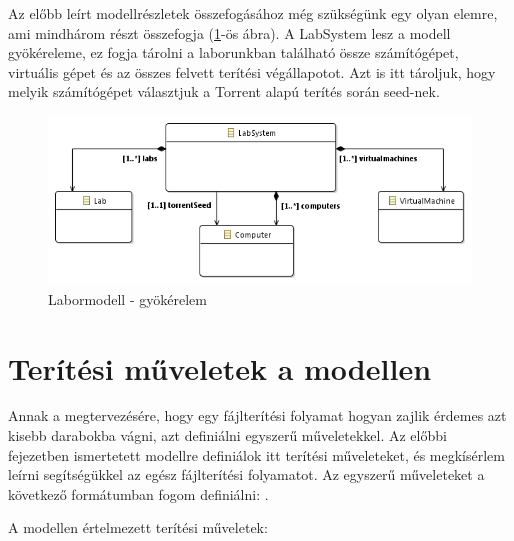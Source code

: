Az előbb leírt modellrészletek összefogásához még szükségünk egy olyan elemre, ami mindhárom részt összefogja (\ref{fig:designmodelroot}-ös ábra). A LabSystem lesz a modell gyökéreleme, ez fogja tárolni a laborunkban található össze számítógépet, virtuális gépet és az összes felvett terítési végállapotot. Azt is itt tároljuk, hogy melyik számítógépet választjuk a Torrent alapú terítés során seed-nek.

\begin{figure}[h!]
	\centering
	\includegraphics[width=130mm, keepaspectratio]{figures/design_modelroot.png}
	\caption{Labormodell - gyökérelem}
	\label{fig:designmodelroot}
\end{figure}

\section{Terítési műveletek a modellen}
\label{distrops}

Annak a megtervezésére, hogy egy fájlterítési folyamat hogyan zajlik érdemes azt kisebb darabokba vágni, azt definiálni egyszerű műveletekkel.
Az előbbi fejezetben ismertetett modellre definiálok itt terítési műveleteket, és megkísérlem leírni segítségükkel az egész fájlterítési folyamatot.
Az egyszerű műveleteket a következő formátumban fogom definiálni: .


A modellen értelmezett terítési műveletek:

